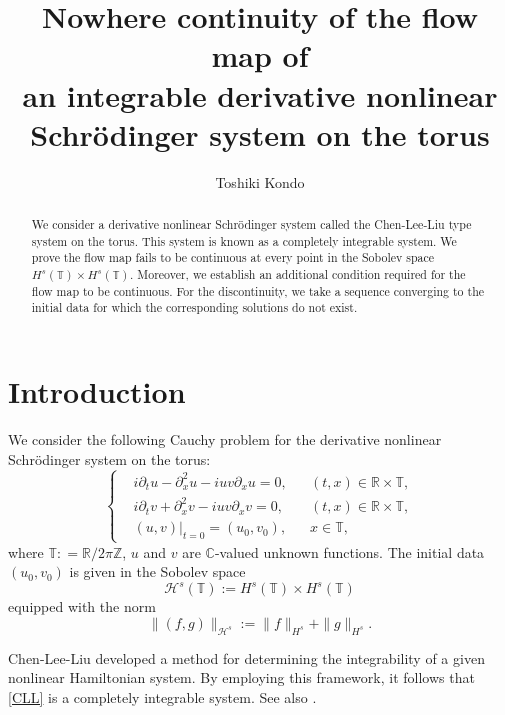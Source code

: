 \documentclass[%
11pt,  reqno]{amsart}
\title[Nowhere continuity of the flow map of dNLS system on $\T$]
{Nowhere continuity of the flow map of \\ an integrable derivative nonlinear Schr\"odinger system
on the torus}
\author[T.~Kondo]
{Toshiki Kondo}
\newcommand{\Z}{\mathbb{Z}}
\newcommand{\R}{\mathbb{R}}
\newcommand{\C}{\mathbb{C}}
\newcommand{\T}{\mathbb{T}}
\renewcommand{\H}{\mathcal H}
\newcommand{\dx}{\partial_x}
\newcommand{\dt}{\partial_t}
\numberwithin{equation}{section}
\numberwithin{theorem}{section}
\begin{document}
\begin{abstract}
We consider a derivative nonlinear Schr\"odinger system
called the Chen-Lee-Liu type system on the torus.
This system is known as a completely integrable system.
We prove the flow map fails to be continuous at every point 
in the Sobolev space $H^s(\T) \times H^s(\T)$.
Moreover, we establish an additional condition required for the flow map to be continuous.
For the discontinuity, we take a sequence converging to the initial data for which the corresponding solutions do not exist. 
\end{abstract}


\maketitle



\section{Introduction}

We consider the following Cauchy problem for the derivative nonlinear Schr\"odinger system on the torus: 
\begin{equation}
\left\{
\begin{aligned}
&i \dt u - \dx^2 u - i u v \dx u = 0, && (t,x) \in \R \times \T,
\\
&i \dt v + \dx^2 v - i u v \dx v = 0, && (t,x) \in \R \times \T,
\\
&(u, v)|_{t=0} = (u_0, v_0), && x \in \T,
\end{aligned}
\right.
\label{CLL}
\end{equation}
where $\T : = \R / 2 \pi \Z$, $u$ and $v$ are $\C$-valued unknown functions. 
The initial data $(u_0, v_0)$ is given in the Sobolev space
\[
\H^s(\T) := H^s(\T) \times H^s(\T)
\] 
equipped with the norm
\[
\| (f ,g) \|_{\H^s} := \|f\|_{H^s} + \|g\|_{H^s}. 
\]

Chen-Lee-Liu \cite{CLL79} developed a method for determining the integrability 
of a given nonlinear Hamiltonian system. 
By employing this framework, 
it follows that \eqref{CLL} is a completely integrable system. See also \cite{AKNS74}.
\end{document}
